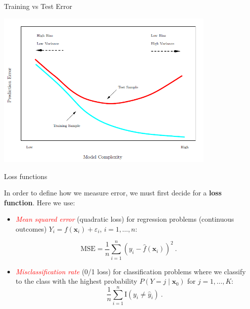 \documentclass[
  10pt,
  ignorenonframetext,
]{beamer}
\providecommand{\tightlist}{%
  \setlength{\itemsep}{0pt}\setlength{\parskip}{0pt}}
\begin{document}
\begin{frame}
\begin{block}{Training vs Test Error}
\protect\hypertarget{training-vs-test-error}{}
\(~\)

\centering

\includegraphics[width=0.8\textwidth,height=\textheight]{training_test.png}
\end{block}
\end{frame}

\begin{frame}
\begin{block}{Loss functions}
\protect\hypertarget{loss-functions}{}
\(~\)

In order to define how we measure error, we must first decide for a
\textbf{loss function}. Here we use:

\vspace{2mm}

\begin{itemize}
\tightlist
\item
  \emph{\textcolor{red}{Mean squared error}} (quadratic loss) for
  regression problems (continuous outcomes)
  \(Y_i=f({\boldsymbol x}_i)+\varepsilon_i\), \(i=1,\ldots, n\):
\end{itemize}

\[\text{MSE}=\frac{1}{n}\sum_{i=1}^n (y_i-\hat{f}({\boldsymbol x}_i))^2 \ .\]

\vspace{2mm}

\begin{itemize}
\tightlist
\item
  \emph{\textcolor{red}{Misclassification rate}} (0/1 loss) for
  classification problems where we classify to the class with the
  highest probability \(P(Y=j\mid {\boldsymbol x}_0)\) for
  \(j=1,\ldots,K\):
  \[\frac{1}{n}\sum_{i=1}^n \text{I}(y_i \neq \hat{y}_i) \ .\]
\end{itemize}
\end{block}
\end{frame}
\end{document}
